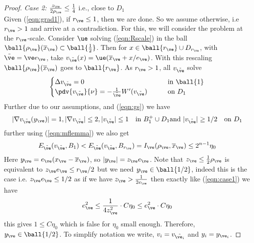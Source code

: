 \begin{proof}
\textit{Case 2: }$ \frac{z_\ve}{2\rho_\ve} \leq \frac{1}{4}$ i.e., close to $D_1$\\
            Given (\ref{eqn:grad1}), if $r_\ve \leq 1$, then we are done. So we assume otherwise, i.e $r_\ve > 1$ and arrive at a contradiction. For this, we will consider the problem at the $r_\ve$-scale. Consider $\ue$ solving (\ref{eqn:Rscale}) in the ball $\ball {\rho_{\ve}}(\overline{x}_\ve) \subset \ball {\frac{1}{2}} $. Then for $x \in \ball {r_\ve} \cup D_{r_\ve}$, with $\Tilde{\ve} = \ve e_\ve$, take
            $v_{\Tilde{\ve}}(x) = \ue (\overline{x}_\ve + x/e_\ve) $. With this rescaling $\ball {\rho_\ve}(\overline{x}_\ve)$ goes to $\ball {r_\ve}$. As $r_\ve > 1$, all $v_{\Tilde{\ve}}$ solve
            \begin{equation} \label{eqn:rscale}
        \begin{cases}
            \Delta v_{\Tilde{\ve}} = 0 \qquad &\text{in } \ball {1} \\
            \pdv{v_{\Tilde{\ve}}}{\nu} = -\frac{1}{\Tilde{\ve}}W'(v_{\Tilde{\ve}}) \qquad  &\text{on  } D_{1}
        \end{cases}
    \end{equation}
           Further due to our assumptions, and (\ref{eqn:gs}) we have
        \begin{equation} \label{eqn:convestimates}
            |\nabla v_{\Tilde{\ve}} (y_\ve)|=1 ,|\nabla v_{\Tilde{\ve}}| \leq 2,|v_{\Tilde{\ve}}| \leq 1 \quad \text{in } B_1^+ \cup D_1 \text{and } |v_{\Tilde{\ve}}|\geq 1/2 \quad \text{on } D_1 
        \end{equation}
        further using (\ref{eqn:mflemma}) we also get
        \begin{equation}\label{eqn:energyconv}
            E_{\Tilde{\ve}}(v_{\Tilde{\ve}}, B_1)<E_{\Tilde{\ve}}(v_{\Tilde{\ve}}, B_{r_\ve})=I_\ve(\rho_\ve,\overline{x}_\ve) \leq 2^{n-1} \eta_0
        \end{equation}
            Here $y_\ve = e_\ve(x_\ve-\overline{x}_\ve)$, so $|y_\ve|= z_\ve e_\ve$. Note that $z_\ve \leq \frac{1}{2}\rho_\ve$ is equivalent to $z_\ve e_\ve \leq r_\ve/2$ but we need $y_\ve \in \ball {1/2}$, indeed this is the case i.e.   $z_\ve e_\ve \leq 1/2$ as if we have $z_\ve > \frac{1}{2e_\ve}$ then exactly like (\ref{eqn:case1}) we have
            $$ e_\ve^2 \leq \frac{1}{4z_\ve^2}\cdot C\eta_0 \leq e_\ve^2\cdot C\eta_0$$ this gives $1 \leq C\eta_0 $
            which is false for $\eta_0$ small enough. Therefore, $y_\ve \in \ball {1/2}$. To simplify notation we write, $v_i=v_{\Tilde{\ve_i}}$ and $y_i=y_{\ve_{i}}$. 
            

\end{proof}
